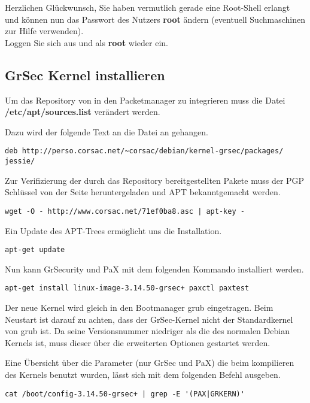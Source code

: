 Herzlichen Glückwunsch, Sie haben vermutlich gerade eine Root-Shell erlangt und können nun das Passwort des Nutzers \textbf{root} ändern (eventuell Suchmaschinen zur Hilfe verwenden).\\
Loggen Sie sich aus und als \textbf{root} wieder ein.

\subsection{GrSec Kernel installieren}
\label{subsec:GrSec Kernel installieren}

Um das Repository von  in den Packetmanager zu integrieren muss die Datei \textbf{/etc/apt/sources.list} verändert werden.

Dazu wird der folgende Text an die Datei an gehangen. 
\begin{lstlisting}[numbers=none, frame=single, lineskip={-2.5pt}]
deb http://perso.corsac.net/~corsac/debian/kernel-grsec/packages/ jessie/
\end{lstlisting}

Zur Verifizierung der durch das Repository bereitgestellten Pakete muss der PGP Schlüssel von der Seite heruntergeladen und APT bekanntgemacht werden.
\begin{lstlisting}[numbers=none, frame=single, lineskip={-2.5pt}]
wget -O - http://www.corsac.net/71ef0ba8.asc | apt-key -
\end{lstlisting}

Ein Update des APT-Trees ermöglicht uns die Installation.
\begin{lstlisting}[numbers=none, frame=single, lineskip={-2.5pt}]
apt-get update
\end{lstlisting}

Nun kann GrSecurity und PaX mit dem folgenden Kommando installiert werden.
\begin{lstlisting}[numbers=none, frame=single, lineskip={-2.5pt}]
apt-get install linux-image-3.14.50-grsec+ paxctl paxtest
\end{lstlisting}

Der neue Kernel wird gleich in den Bootmanager grub eingetragen. Beim Neustart ist darauf zu achten, dass der GrSec-Kernel nicht der Standardkernel von grub ist. Da seine Versionsnummer niedriger als die des normalen Debian Kernels ist, muss dieser über die erweiterten Optionen gestartet werden.

Eine Übersicht über die Parameter (nur GrSec und PaX) die beim kompilieren des Kernels benutzt wurden, lässt sich mit dem folgenden Befehl ausgeben.
\begin{lstlisting}
cat /boot/config-3.14.50-grsec+ | grep -E '(PAX|GRKERN)'
\end{lstlisting}

